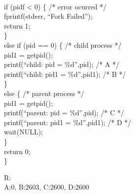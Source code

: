 \begin{itemize}
\begin{itemize}
	\\
	if (pidf < 0) \{ /* error ocurred */\\
		fprintf(stderr, ``Fork Failed'');\\
		return 1;\\
	\}\\
	else if (pid == 0) \{	/* child process */\\
	pid1 = getpid();\\
	printf(``child: pid = \%d'',pid); /* A */\\
	printf(``child: pid1 = \%d'',pid1); /* B */ \\
	\}\\
	else \{ /* parent process */\\
		pid1 = getpid();\\
		printf(``parent: pid = \%d'',pid); /* C */\\
		printf(``parent: pid1 = \%d'',pid1); /* D */\\
		wait(NULL);\\
	\}\\
	return 0;\\
\}
\end{itemize}
R:\\
A:0, B:2603, C:2600, D:2600
\end{itemize}
